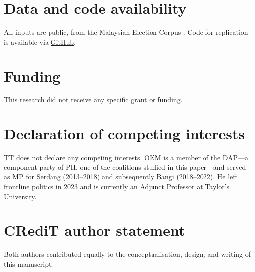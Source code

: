 \documentclass[11pt]{article}
\begin{document}
\section*{Data and code availability}
All inputs are public, from the Malaysian Election Corpus \cite{meco1}. Code for replication is available via \href{https://github.com/Thevesh/paper-saluran-jhr-se16}{GitHub}.

\section*{Funding}
This research did not receive any specific grant or funding.

\section*{Declaration of competing interests}

TT does not declare any competing interests. OKM is a member of the DAP---a component party of PH, one of the coalitions studied in this paper---and served as MP for Serdang (2013--2018) and subsequently Bangi (2018--2022). He left frontline politics in 2023 and is currently an Adjunct Professor at Taylor's University.

\section*{CRediT author statement}
Both authors contributed equally to the conceptualisation, design, and writing of this manuscript.

\newpage


\end{document}
